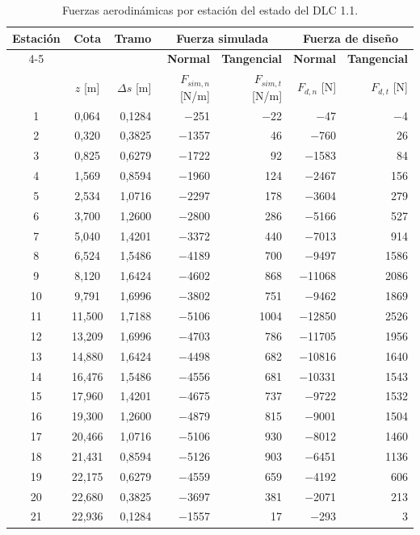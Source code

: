 \begin{table}[H]
    \centering
    \caption{Fuerzas aerodinámicas por estación del estado del DLC 1.1.}
    \label{tab:anexo_fuerzas_dlc11}
    \begin{tabular}{ccrrrrr}
        \hline
        \textbf{Estación} & \textbf{Cota} & \textbf{Tramo} & \multicolumn{2}{c}{\textbf{Fuerza simulada}} & \multicolumn{2}{c}{\textbf{Fuerza de diseño}} \\
        \cline{4-5} \cline{6-7}
        & & & \textbf{Normal} & \textbf{Tangencial} & \textbf{Normal} & \textbf{Tangencial} \\
        & $z$ [m] & $\Delta s$ [m] & $F_{sim,n}$ [N/m] & $F_{sim,t}$ [N/m] & $F_{d,n}$ [N] & $F_{d,t}$ [N] \\
        \hline
        1 & 0{,}064 & 0{,}1284 & $-$251 & $-$22 & $-$47 & $-$4 \\
        2 & 0{,}320 & 0{,}3825 & $-$1357 & 46 & $-$760 & 26 \\
        3 & 0{,}825 & 0{,}6279 & $-$1722 & 92 & $-$1583 & 84 \\
        4 & 1{,}569 & 0{,}8594 & $-$1960 & 124 & $-$2467 & 156 \\
        5 & 2{,}534 & 1{,}0716 & $-$2297 & 178 & $-$3604 & 279 \\
        6 & 3{,}700 & 1{,}2600 & $-$2800 & 286 & $-$5166 & 527 \\
        7 & 5{,}040 & 1{,}4201 & $-$3372 & 440 & $-$7013 & 914 \\
        8 & 6{,}524 & 1{,}5486 & $-$4189 & 700 & $-$9497 & 1586 \\
        9 & 8{,}120 & 1{,}6424 & $-$4602 & 868 & $-$11068 & 2086 \\
        10 & 9{,}791 & 1{,}6996 & $-$3802 & 751 & $-$9462 & 1869 \\
        11 & 11{,}500 & 1{,}7188 & $-$5106 & 1004 & $-$12850 & 2526 \\
        12 & 13{,}209 & 1{,}6996 & $-$4703 & 786 & $-$11705 & 1956 \\
        13 & 14{,}880 & 1{,}6424 & $-$4498 & 682 & $-$10816 & 1640 \\
        14 & 16{,}476 & 1{,}5486 & $-$4556 & 681 & $-$10331 & 1543 \\
        15 & 17{,}960 & 1{,}4201 & $-$4675 & 737 & $-$9722 & 1532 \\
        16 & 19{,}300 & 1{,}2600 & $-$4879 & 815 & $-$9001 & 1504 \\
        17 & 20{,}466 & 1{,}0716 & $-$5106 & 930 & $-$8012 & 1460 \\
        18 & 21{,}431 & 0{,}8594 & $-$5126 & 903 & $-$6451 & 1136 \\
        19 & 22{,}175 & 0{,}6279 & $-$4559 & 659 & $-$4192 & 606 \\
        20 & 22{,}680 & 0{,}3825 & $-$3697 & 381 & $-$2071 & 213 \\
        21 & 22{,}936 & 0{,}1284 & $-$1557 & 17 & $-$293 & 3 \\
        \hline
    \end{tabular}
\end{table}

